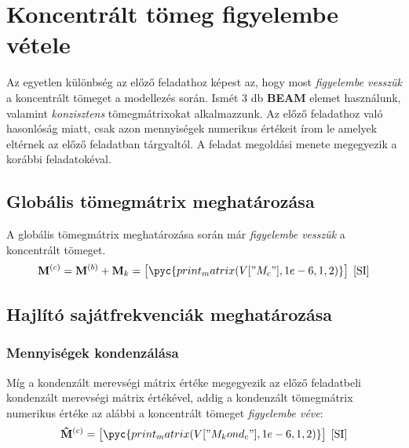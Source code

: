 \documentclass[12pt,a4paper]{article}
\def\mx#1{\mathbf{#1}}
\def\ui#1{\left(#1\right)}
\def\SI{\; \left[\mathrm{SI}\right]}
\begin{document}
\section{Koncentrált tömeg figyelembe vétele}
Az egyetlen különbség az előző feladathoz képest az, hogy most \textit{figyelembe vesszük}
a koncentrált tömeget a modellezés során. Ismét 3 db \textbf{BEAM} elemet használunk,
valamint \textit{konzisztens} tömegmátrixokat alkalmazzunk. Az előző feladathoz való
hasonlóság miatt, csak azon mennyiségek numerikus értékeit írom le amelyek eltérnek az előző
feladatban tárgyaltól. A feladat megoldási menete megegyezik a korábbi feladatokéval.
\subsection{Globális tömegmátrix meghatározása}
A globális tömegmátrix meghatározása során már \textit{figyelembe vesszük} a koncentrált
tömeget.
\begin{equation*}
    \mx{M}^{\ui{c}}=\mx{M}^{\ui{b}}+\mx{M}_k=
    \begin{bmatrix}
        \pyc{print_matrix(V["M_c"],1e-6,1,2)}
    \end{bmatrix} \SI
\end{equation*}
\subsection{Hajlító sajátfrekvenciák meghatározása}
\subsubsection{Mennyiségek kondenzálása}
Míg a kondenzált merevségi mátrix értéke megegyezik az előző feladatbeli kondenzált merevségi
mátrix értékével, addig a kondenzált tömegmátrix numerikus értéke az alábbi a koncentrált tömeget
\textit{figyelembe véve}:
\begin{equation*}
    \mx{\hat{M}}^{\ui{c}}=
    \begin{bmatrix}
        \pyc{print_matrix(V["M_kond_c"],1e-6,1,2)}
    \end{bmatrix} \SI
\end{equation*}
\end{document}
